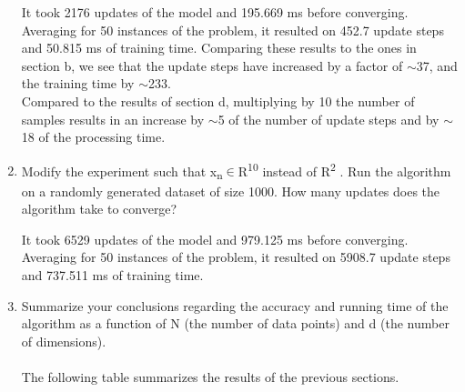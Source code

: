 \documentclass{article}
\begin{document}
\begin{enumerate}[label=(\alph*)]
It took 2176 updates of the model and 195.669 ms before converging.\\
Averaging for 50 instances of the problem, it resulted on 452.7 update steps and 50.815 ms of training time.
Comparing these results to the ones in section b, we see that the update steps have increased by a factor of $\sim$37, and the training time by $\sim$233.\\
Compared to the results of section d, multiplying by 10 the number of samples results in an increase by $\sim$5 of the number of update steps and by $\sim$18 of the processing time.

\item Modify the experiment such that x\textsubscript{n}$\in$R\textsuperscript{10} instead of R\textsuperscript{2} . Run the algorithm on a randomly generated dataset of size 1000. How many updates does the algorithm take to converge?

It took 6529 updates of the model and 979.125 ms before converging.\\
Averaging for 50 instances of the problem, it resulted on 5908.7 update steps and 737.511 ms of training time.

\item Summarize your conclusions regarding the accuracy and running time of the algorithm as a function of N (the number of data points) and d (the number of dimensions).\\\\
The following table summarizes the results of the previous sections.

\begin{table}[H]
{\centering
{}}
\caption{Summarized results.}
\end{table}



\end{enumerate}
\end{document}
